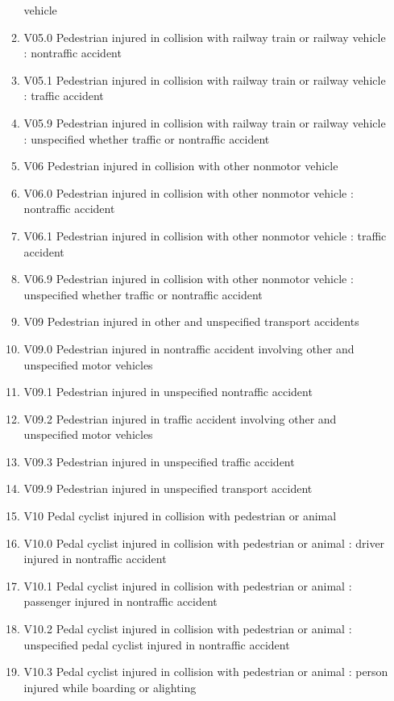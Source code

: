 \documentclass[
]{scrartcl}
\begin{document}
\begin{itemize}
\begin{enumerate}
    vehicle
  \item
    V05.0 Pedestrian injured in collision with railway train or railway
    vehicle : nontraffic accident
  \item
    V05.1 Pedestrian injured in collision with railway train or railway
    vehicle : traffic accident
  \item
    V05.9 Pedestrian injured in collision with railway train or railway
    vehicle : unspecified whether traffic or nontraffic accident
  \item
    V06 Pedestrian injured in collision with other nonmotor vehicle
  \item
    V06.0 Pedestrian injured in collision with other nonmotor vehicle :
    nontraffic accident
  \item
    V06.1 Pedestrian injured in collision with other nonmotor vehicle :
    traffic accident
  \item
    V06.9 Pedestrian injured in collision with other nonmotor vehicle :
    unspecified whether traffic or nontraffic accident
  \item
    V09 Pedestrian injured in other and unspecified transport accidents
  \item
    V09.0 Pedestrian injured in nontraffic accident involving other and
    unspecified motor vehicles
  \item
    V09.1 Pedestrian injured in unspecified nontraffic accident
  \item
    V09.2 Pedestrian injured in traffic accident involving other and
    unspecified motor vehicles
  \item
    V09.3 Pedestrian injured in unspecified traffic accident
  \item
    V09.9 Pedestrian injured in unspecified transport accident
  \item
    V10 Pedal cyclist injured in collision with pedestrian or animal
  \item
    V10.0 Pedal cyclist injured in collision with pedestrian or animal :
    driver injured in nontraffic accident
  \item
    V10.1 Pedal cyclist injured in collision with pedestrian or animal :
    passenger injured in nontraffic accident
  \item
    V10.2 Pedal cyclist injured in collision with pedestrian or animal :
    unspecified pedal cyclist injured in nontraffic accident
  \item
    V10.3 Pedal cyclist injured in collision with pedestrian or animal :
    person injured while boarding or alighting

\end{enumerate}
\end{itemize}
\end{document}
